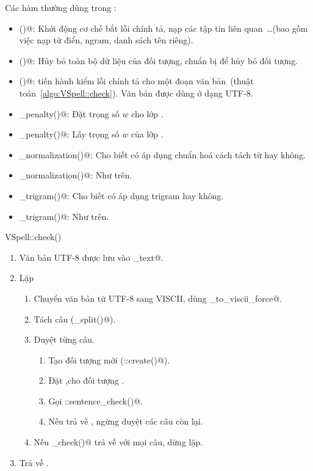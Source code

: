 \documentclass[a4paper,oneside,14pt]{extbook} %
\begin{document}
Các hàm thường dùng trong \verb@VSpell@:
\begin{itemize}
\item \verb@init()@: Khởi động cơ chế bắt lỗi chính tả, nạp các tập
  tin liên quan~\ldots (bao gồm việc nạp từ điển, n\-gram, danh sách tên
  riêng). 
\item \verb@cleanup()@: Hủy bỏ toàn bộ dữ liệu của đối tượng, chuẩn bị để
  hủy bỏ đối tượng.
\item \verb@check()@: tiến hành kiểm lỗi chính tả cho một đoạn văn
  bản~(thuật toán~\ref{algo:VSpell::check}). Văn bản được dùng ở dạng
  UTF-8. 
\item \verb@set_penalty()@: Đặt trọng số $w$ cho lớp \verb@PenaltyDAG@.
\item \verb@get_penalty()@: Lấy trọng số $w$ của lớp
  \verb@PenaltyDAG@.
\item \verb@set_normalization()@: Cho biết có áp dụng chuẩn hoá cách
  tách từ hay không.
\item \verb@get_normalization()@: Như trên.
\item \verb@set_tri\-gram()@: Cho biết có áp dụng tri\-gram hay không.
\item \verb@get_tri\-gram()@: Như trên.
\end{itemize}

\begin{algo}
\caption{VSpell::check()}
\label{algo:VSpell::check}
\begin{enumerate}
\item Văn bản UTF-8 được lưu vào _text@.
\item Lặp
  \begin{enumerate}
  \item Chuyển văn bản từ UTF-8 sang VISCII, dùng
    \verb@viet_to_viscii_force@.
  \item Tách câu (\verb@sentences_split()@).
  \item Duyệt từng câu.
    \begin{enumerate}
    \item Tạo đối tượng \verb@Text@ mới
      (\verb@TextFactory::create()@).
    \item Đặt \verb@offset@,\verb@length@ cho đối tượng \verb@Text@. 
    \item Gọi \verb@Text::sentence_check()@.
    \item Nếu trả về \verb@false@, ngừng duyệt các câu còn lại.
    \end{enumerate}
  \item Nếu \verb@sentence_check()@ trả về \verb@true@ với mọi câu,
    dừng lặp.
  \end{enumerate}
\item Trả về \verb@true@.
\end{enumerate}
\end{algo}
\end{document}
